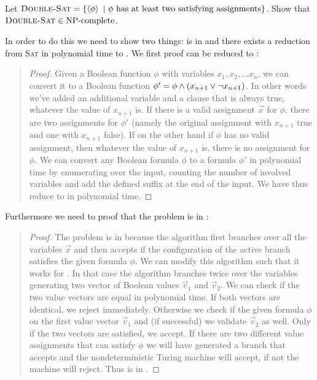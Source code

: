 \documentclass{article}
\begin{document}
\begin{exercise}
Let $\mbox{\textsc{Double-Sat}}=\left\{ \left\langle \phi \right\rangle\ |\ \phi\mbox{ has at least two satisfying assignments} \right\}$. Show that $\mbox{\textsc{Double-Sat}}\in\mbox{NP-complete}$.
\begin{answer}
In order to do this we need to show two things:  is in  and there exists a reduction from \textsc{Sat} in polynomial time to . We first proof  can be reduced to :
\begin{quote}\begin{proof}
Given a Boolean function $\phi$ with variables $x_1,x_2,\ldots x_n$, we can convert it to a Boolean function $\phi'=\phi\wedge\left( x_{n+1}\vee\neg x_{n+1} \right)$. In other words we've added an additional variable and a clause that is always true, whatever the value of $x_{n+1}$ is. If there is a valid assignment $\vec{x}$ for $\phi$, there are two assignments for $\phi'$ (namely the original assignment with $x_{n+1}$ true and one with $x_{n+1}$ false). If on the other hand if $\phi$ has no valid assignment, then whatever the value of $x_{n+1}$ is, there is no assignment for $\phi$. We can convert any Boolean formula $\phi$ to a formula $\phi'$ in polynomial time by enumerating over the input, counting the number of involved variables and add the defined suffix at the end of the input. We have thus reduce  to  in polynomial time.
\end{proof}\end{quote}
Furthermore we need to proof that the problem is in :
\begin{quote}\begin{proof}
The  problem is in  because the algorithm first branches over all the variables $\vec{x}$ and then accepts if the configuration of the active branch satisfies the given formula $\phi$. We can modify this algorithm such that it works for . In that case the algorithm branches twice over the variables generating two vector of Boolean values $\vec{v}_1$ and $\vec{v}_2$. We can check if the two value vectors are equal in polynomial time. If both vectors are identical, we reject immediately. Otherwise we check if the given formula $\phi$ on the first value vector $\vec{v}_1$ and (if successful) we validate $\vec{v}_2$ as well. Only if the two vectors are satisfied, we accept. If there are two different value assignments that can satisfy $\phi$ we will have generated a branch that accepts and the nondeterministic Turing machine will accept, if not the machine will reject. Thus  is in .
\end{proof}\end{quote}
\end{answer}
\end{exercise}
\end{document}
